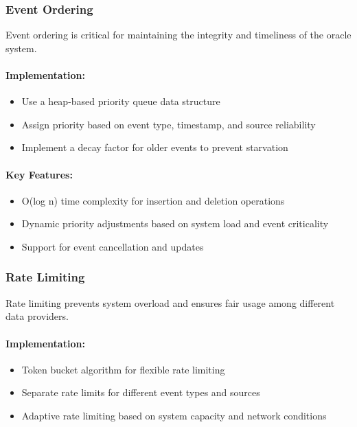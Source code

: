 \documentclass[12pt,a4paper]{article}
\begin{document}
	\subsubsection{Event Ordering}
	Event ordering is critical for maintaining the integrity and timeliness of the oracle system.
	
	\paragraph{Implementation:}
	\begin{itemize}
		\item Use a heap-based priority queue data structure
		\item Assign priority based on event type, timestamp, and source reliability
		\item Implement a decay factor for older events to prevent starvation
	\end{itemize}
	
	\paragraph{Key Features:}
	\begin{itemize}
		\item O(log n) time complexity for insertion and deletion operations
		\item Dynamic priority adjustments based on system load and event criticality
		\item Support for event cancellation and updates
	\end{itemize}
	
	\subsubsection{Rate Limiting}
	Rate limiting prevents system overload and ensures fair usage among different data providers.
	
	\paragraph{Implementation:}
	\begin{itemize}
		\item Token bucket algorithm for flexible rate limiting
		\item Separate rate limits for different event types and sources
		\item Adaptive rate limiting based on system capacity and network conditions
	\end{itemize}
	
\end{document}
